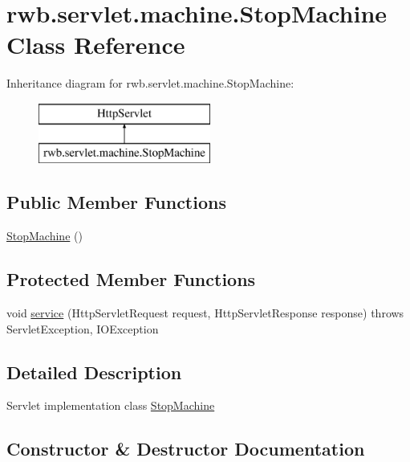 \hypertarget{classrwb_1_1servlet_1_1machine_1_1_stop_machine}{}\section{rwb.\+servlet.\+machine.\+Stop\+Machine Class Reference}
\label{classrwb_1_1servlet_1_1machine_1_1_stop_machine}
Inheritance diagram for rwb.\+servlet.\+machine.\+Stop\+Machine\+:\begin{figure}[H]
\begin{center}
\leavevmode
\includegraphics[height=2.000000cm]{classrwb_1_1servlet_1_1machine_1_1_stop_machine}
\end{center}
\end{figure}
\subsection*{Public Member Functions}
\begin{DoxyCompactItemize}
\item 
\hyperlink{classrwb_1_1servlet_1_1machine_1_1_stop_machine_aab2ac106ec67027e594e4126e79661b4}{Stop\+Machine} ()
\end{DoxyCompactItemize}
\subsection*{Protected Member Functions}
\begin{DoxyCompactItemize}
\item 
void \hyperlink{classrwb_1_1servlet_1_1machine_1_1_stop_machine_ab9b293fb9c090bff7d3f476a959bae87}{service} (Http\+Servlet\+Request request, Http\+Servlet\+Response response)  throws Servlet\+Exception, I\+O\+Exception 
\end{DoxyCompactItemize}


\subsection{Detailed Description}
Servlet implementation class \hyperlink{classrwb_1_1servlet_1_1machine_1_1_stop_machine}{Stop\+Machine} 

\subsection{Constructor \& Destructor Documentation}
\mbox{\label{classrwb_1_1servlet_1_1machine_1_1_stop_machine_aab2ac106ec67027e594e4126e79661b4}} 
